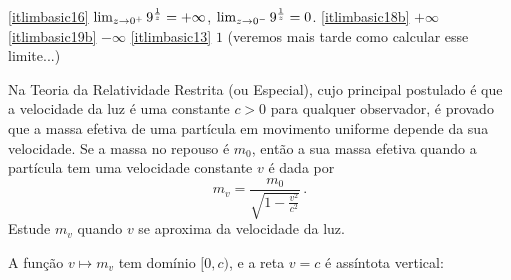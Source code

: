 \begin{exo}
\begin{sol}
\begin{center}
\begin{bmlimage}\end{bmlimage}
\end{center}
\eqref{itlimbasic16} $\lim_{{z}\to {0^+}}9^{\frac{1}{z}}=+\infty$, 
$\lim_{{z}\to {0^-}}9^{\frac{1}{z}}=0$.
\eqref{itlimbasic18b} $+\infty$
\eqref{itlimbasic19b} $-\infty$
\eqref{itlimbasic13} $1$ (veremos mais tarde como calcular esse
limite...) 
\end{sol}
\end{exo}

\begin{exo}
Na Teoria da Relatividade Restrita (ou Especial), cujo principal 
postulado é que a velocidade da luz é uma constante $c>0$ para
qualquer observador, 
é provado que a massa efetiva de uma partícula em movimento uniforme 
depende da sua velocidade. Se a massa no repouso é $m_0$, então a sua
massa efetiva quando a partícula tem uma
velocidade constante $v$ é dada por
$$m_v=\frac{m_0}{\sqrt{1-\frac{v^2}{c^2}}}\,.$$
Estude $m_v$ quando $v$ se aproxima da velocidade da luz.
\begin{sol}
A função $v\mapsto m_v$ tem domínio $[0,c)$, e a reta $v=c$ é 
assíntota vertical: 
\begin{center}
\begin{bmlimage}\end{bmlimage}
\end{center}
\end{sol}
\end{exo}

